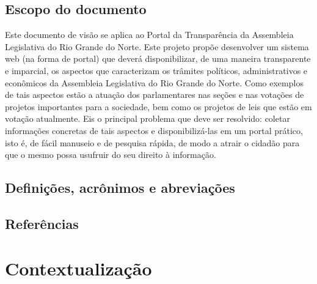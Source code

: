 \documentclass[12pt, a4paper]{article}
\begin{document}
        \subsection{Escopo do documento}
        Este documento de visão se aplica ao Portal da Transparência da Assembleia
        Legislativa do Rio Grande do Norte. Este projeto propõe desenvolver um sistema
        web (na forma de portal) que deverá disponibilizar, de uma maneira transparente
        e imparcial, os aspectos que caracterizam os trâmites políticos,
        administrativos e econômicos da Assembleia Legislativa do Rio Grande do Norte.
        Como exemplos de tais aspectos estão a atuação dos parlamentares nas seções e
        nas votações de projetos importantes para a sociedade, bem como os projetos de
        leis que estão em votação atualmente. Eis o principal problema que deve ser
        resolvido: coletar informações concretas de tais aspectos e disponibilizá-las
        em um portal prático, isto é, de fácil manuseio e de pesquisa rápida, de modo a
        atrair o cidadão para que o mesmo possa usufruir do seu direito à informação.


        \subsection{Definições, acrônimos e abreviações}

        \subsection{Referências}

    \section{Contextualização}
\end{document}
